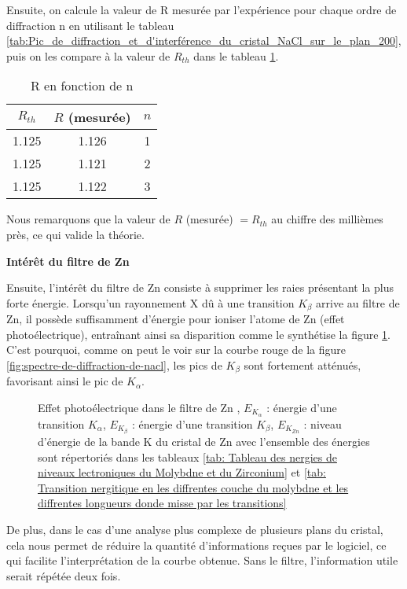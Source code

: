 \newpage
Ensuite, on calcule la valeur de R mesurée par l'expérience pour chaque ordre de diffraction n en utilisant le tableau \ref{tab:Pic_de_diffraction_et_d'interférence_du_cristal_NaCl_sur_le_plan_200}, puis on les compare à la valeur de $R_{th}$ dans le tableau \ref{tab:R en fonction de n}.





	
	
	
	



\begin{table}[h!]
	\centering
	\begin{tabular}{|c|c|c|}
		\hline
		$R_{th}$& $R$ (mesurée) & $n$ \\ \hline
		1.125 &1.126 & 1 \\ \hline
		1.125 &1.121& 2 \\ \hline
		1.125 & 1.122& 3 \\ \hline
	\end{tabular}
	\caption{R en fonction de n}
	\label{tab:R en fonction de n}
\end{table}




Nous remarquons que la valeur de $R$ (mesurée) $= R_{th}$ au chiffre des millièmes près, ce qui valide la théorie.

 \begin{flushleft}
	\textbf{Intérêt du filtre de Zn}
\end{flushleft}







 
Ensuite, l'intérêt du filtre de Zn consiste à supprimer les raies présentant la plus forte énergie. Lorsqu'un rayonnement X dû à une transition $K_{\beta}$ arrive au filtre de Zn, il possède suffisamment d'énergie pour ioniser l'atome de Zn (effet photoélectrique), entraînant ainsi sa disparition comme le synthétise la figure \ref{fig: Effet photoélectrique de le métal de Zn}. C'est pourquoi, comme on peut le voir sur la courbe rouge de la figure \ref{fig:spectre-de-diffraction-de-nacl}, les pics de $K_{\beta}$ sont fortement atténués, favorisant ainsi le pic de $K_{\alpha}$. 

\begin{figure}[h!]
	\centering
	
	\caption{\centering Effet photoélectrique dans le filtre de Zn , $E_{K_{\alpha}}$ : énergie d'une transition $K_{\alpha}$, $E_{K_{\beta}}$ : énergie d'une transition $K_{\beta}$, $E_{K_{Zn}}$ : niveau d'énergie de la bande K du cristal de Zn avec l'ensemble des énergies sont répertoriés dans les tableaux \ref{tab: Tableau des nergies de niveaux lectroniques du Molybdne et du Zirconium} et \ref{tab: Transition nergitique en les diffrentes couche du molybdne et les diffrentes longueurs donde misse par les transitions}}
	\label{fig: Effet photoélectrique de le métal de Zn}
\end{figure}


De plus, dans le cas d'une analyse plus complexe de plusieurs plans du cristal, cela nous permet de réduire la quantité d'informations reçues par le logiciel, ce qui facilite l'interprétation de la courbe obtenue. Sans le filtre, l'information utile serait répétée deux fois.







